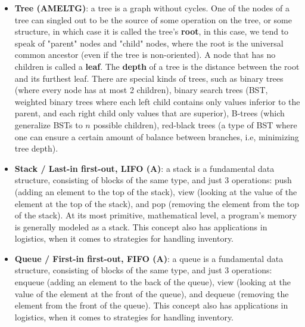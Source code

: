 \documentclass{article}
\begin{document}
\begin{itemize}
	\item \textbf{Tree (AMELTG)}: a tree is a graph without cycles. One of the nodes of a tree can singled out to be the source of some operation on the tree, or some structure, in which case it is called the tree's \textbf{root}, in this case, we tend to speak of "parent" nodes and "child" nodes, where the root is the universal common ancestor (even if the tree is non-oriented). A node that has no children is called a \textbf{leaf}. The \textbf{depth} of a tree is the distance between the root and its furthest leaf. There are special kinds of trees, such as binary trees (where every node has at most 2 children), binary search trees (BST, weighted binary trees where each left child contains only values inferior to the parent, and each right child only values that are superior), B-trees (which generalize BSTs to $n$ possible children), red-black trees (a type of BST where one can ensure a certain amount of balance between branches, i.e, minimizing tree depth). 

	\item \textbf{Stack / Last-in first-out, LIFO (A)}: a stack is a fundamental data structure, consisting of blocks of the same type, and just 3 operations: push (adding an element to the top of the stack), view (looking at the value of the element at the top of the stack), and pop (removing the element from the top of the stack). At its most primitive, mathematical level, a program's memory is generally modeled as a stack. This concept also has applications in logistics, when it comes to strategies for handling inventory.

	\item \textbf{Queue / First-in first-out, FIFO (A)}: a queue is a fundamental data structure, consisting of blocks of the same type, and just 3 operations: enqueue (adding an element to the back of the queue), view (looking at the value of the element at the front of the queue), and dequeue (removing the element from the front of the queue). This concept also has applications in logistics, when it comes to strategies for handling inventory.


\end{itemize}
\end{document}
